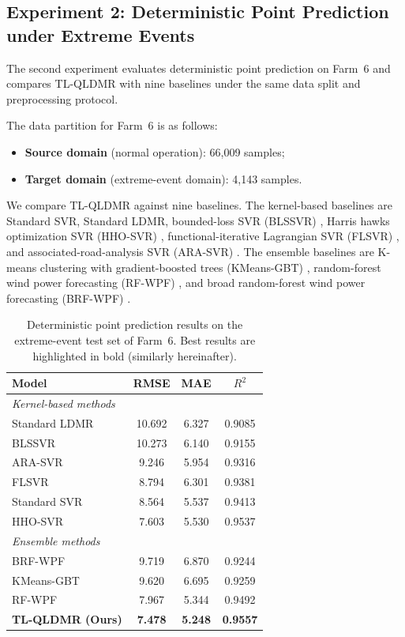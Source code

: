 \documentclass[a4paper]{cas-sc}
\begin{document}
\subsection{Experiment 2: Deterministic Point Prediction under Extreme Events}\label{sec:exp2}

The second experiment evaluates deterministic point prediction on Farm~6 and compares TL-QLDMR with nine baselines under the same data split and preprocessing protocol.

The data partition for Farm~6 is as follows:
\begin{itemize}
    \item \textbf{Source domain} (normal operation): 66{,}009 samples;
    \item \textbf{Target domain} (extreme-event domain): 4{,}143 samples.
\end{itemize}

We compare TL-QLDMR against nine baselines. The kernel-based baselines are Standard SVR, Standard LDMR, bounded-loss SVR (BLSSVR) \citep{fu2023bounded}, Harris hawks optimization SVR (HHO-SVR) \citep{houssein2025hho}, functional-iterative Lagrangian SVR (FLSVR) \citep{meena2025flsvr}, and associated-road-analysis SVR (ARA-SVR) \citep{duan2025ara}. The ensemble baselines are K-means clustering with gradient-boosted trees (KMeans-GBT) \citep{rizkallah2025kmeans}, random-forest wind power forecasting (RF-WPF) \citep{mustaffa2025rf}, and broad random-forest wind power forecasting (BRF-WPF) \citep{chen2025brf}.

\begin{table}[ht]
\centering
\caption{Deterministic point prediction results on the extreme-event test set of Farm~6. Best results are highlighted in bold (similarly hereinafter).}
\setlength{\tabcolsep}{3.5mm}
\begin{tabular}{lccc}
\toprule
Model & RMSE & MAE & $R^2$ \\
\midrule
\multicolumn{4}{l}{\textit{Kernel-based methods}} \\
Standard LDMR & 10.692 & 6.327 & 0.9085 \\
BLSSVR        & 10.273 & 6.140 & 0.9155 \\
ARA-SVR       & 9.246 & 5.954 & 0.9316 \\
FLSVR         & 8.794 & 6.301 & 0.9381 \\
Standard SVR  & 8.564 & 5.537 & 0.9413 \\
HHO-SVR       & 7.603 & 5.530 & 0.9537 \\
\midrule
\multicolumn{4}{l}{\textit{Ensemble methods}} \\
BRF-WPF       & 9.719 & 6.870 & 0.9244 \\
KMeans-GBT    & 9.620 & 6.695 & 0.9259 \\
RF-WPF        & 7.967 & 5.344 & 0.9492 \\
\midrule
\textbf{TL-QLDMR (Ours)} & \textbf{7.478} & \textbf{5.248} & \textbf{0.9557} \\
\bottomrule
\end{tabular}
\label{tab:exp2_results}
\end{table}
\end{document}
